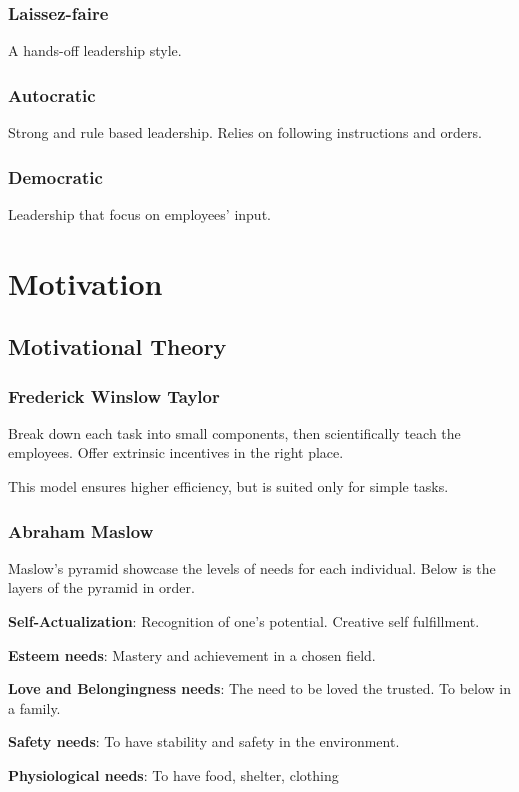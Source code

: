\documentclass{report}
\begin{document}
\subsection{Laissez-faire}
A hands-off leadership style.

\subsection{Autocratic}
Strong and rule based leadership.
Relies on following instructions and orders.

\subsection{Democratic}
Leadership that focus on employees' input.

\chapter{Motivation}

\section{Motivational Theory}

\subsection{Frederick Winslow Taylor}
Break down each task into small components, then scientifically teach the employees.
Offer extrinsic incentives in the right place.

This model ensures higher efficiency, but is suited only for simple tasks.

\subsection{Abraham Maslow}
Maslow's pyramid showcase the levels of needs for each individual.
Below is the layers of the pyramid in order.

\textbf{Self-Actualization}: Recognition of one's potential.
Creative self fulfillment.

\textbf{Esteem needs}: Mastery and achievement in a chosen field.

\textbf{Love and Belongingness needs}: The need to be loved the trusted. 
To below in a family.

\textbf{Safety needs}: To have stability and safety in the environment.

\textbf{Physiological needs}: To have food, shelter, clothing
\end{document}
